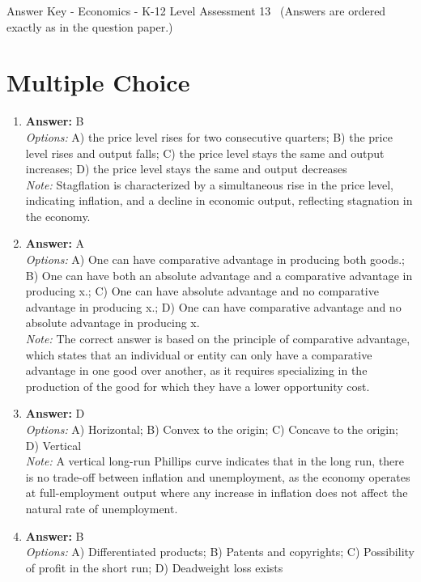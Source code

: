 \documentclass[12pt]{article}
\begin{document}
\begin{center}
Answer Key - Economics - K-12 Level Assessment 13 \
\small (Answers are ordered exactly as in the question paper.)
\end{center}

\section*{Multiple Choice}
\begin{enumerate}[label=\arabic*.]
\item \textbf{Answer:} B
\\ \textit{Options:} A) the price level rises for two consecutive quarters; B) the price level rises and output falls; C) the price level stays the same and output increases; D) the price level stays the same and output decreases
\\ \textit{Note:} Stagflation is characterized by a simultaneous rise in the price level, indicating inflation, and a decline in economic output, reflecting stagnation in the economy.
\item \textbf{Answer:} A
\\ \textit{Options:} A) One can have comparative advantage in producing both goods.; B) One can have both an absolute advantage and a comparative advantage in producing x.; C) One can have absolute advantage and no comparative advantage in producing x.; D) One can have comparative advantage and no absolute advantage in producing x.
\\ \textit{Note:} The correct answer is based on the principle of comparative advantage, which states that an individual or entity can only have a comparative advantage in one good over another, as it requires specializing in the production of the good for which they have a lower opportunity cost.
\item \textbf{Answer:} D
\\ \textit{Options:} A) Horizontal; B) Convex to the origin; C) Concave to the origin; D) Vertical
\\ \textit{Note:} A vertical long-run Phillips curve indicates that in the long run, there is no trade-off between inflation and unemployment, as the economy operates at full-employment output where any increase in inflation does not affect the natural rate of unemployment.
\item \textbf{Answer:} B
\\ \textit{Options:} A) Differentiated products; B) Patents and copyrights; C) Possibility of profit in the short run; D) Deadweight loss exists

\end{enumerate}
\end{document}
